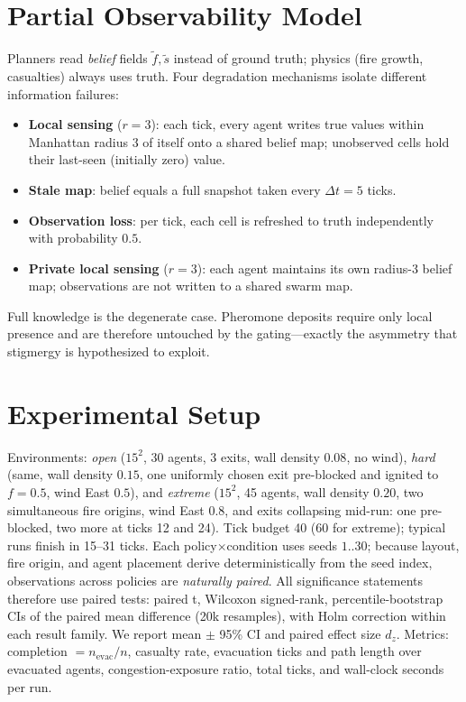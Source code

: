 ﻿\documentclass[conference]{IEEEtran}
\begin{document}
\section{Partial Observability Model}
Planners read \emph{belief} fields $\tilde{f},\tilde{s}$ instead of ground truth; physics (fire growth, casualties) always uses truth. Four degradation mechanisms isolate different information failures:
\begin{itemize}
\item \textbf{Local sensing} ($r{=}3$): each tick, every agent writes true values within Manhattan radius 3 of itself onto a shared belief map; unobserved cells hold their last-seen (initially zero) value.
\item \textbf{Stale map}: belief equals a full snapshot taken every $\Delta t{=}5$ ticks.
\item \textbf{Observation loss}: per tick, each cell is refreshed to truth independently with probability $0.5$.
\item \textbf{Private local sensing} ($r{=}3$): each agent maintains its own radius-3 belief map; observations are not written to a shared swarm map.
\end{itemize}
Full knowledge is the degenerate case. Pheromone deposits require only local presence and are therefore untouched by the gating---exactly the asymmetry that stigmergy is hypothesized to exploit.

\section{Experimental Setup}
\label{sec:setup}
Environments: \emph{open} ($15^2$, 30 agents, 3 exits, wall density $0.08$, no wind), \emph{hard} (same, wall density $0.15$, one uniformly chosen exit pre-blocked and ignited to $f{=}0.5$, wind East $0.5$), and \emph{extreme} ($15^2$, 45 agents, wall density $0.20$, two simultaneous fire origins, wind East $0.8$, and exits collapsing mid-run: one pre-blocked, two more at ticks 12 and 24). Tick budget 40 (60 for extreme); typical runs finish in 15--31 ticks. Each policy$\times$condition uses seeds $1..30$; because layout, fire origin, and agent placement derive deterministically from the seed index, observations across policies are \emph{naturally paired}. All significance statements therefore use paired tests: paired t, Wilcoxon signed-rank, percentile-bootstrap CIs of the paired mean difference (20k resamples), with Holm correction within each result family. We report mean $\pm$ 95\% CI and paired effect size $d_z$. Metrics: completion $=n_{\text{evac}}/n$, casualty rate, evacuation ticks and path length over evacuated agents, congestion-exposure ratio, total ticks, and wall-clock seconds per run.
\end{document}
